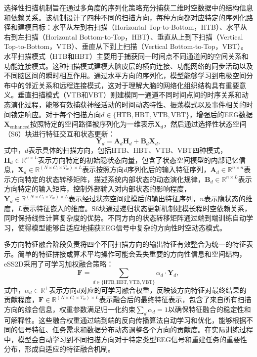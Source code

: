 选择性扫描机制旨在通过多角度的序列化策略充分捕获二维时空数据中的结构信息和依赖关系。该机制设计了四种不同的扫描方向，每种方向都对应特定的序列化路径和建模目标：水平从左到右扫描（Horizontal Top-to-Bottom，HTB）、水平从右到左扫描（Horizontal Bottom-to-Top，HBT）、垂直从上到下扫描（Vertical Top-to-Bottom，VTB）、垂直从下到上扫描（Vertical Bottom-to-Top，VBT）。
水平扫描模式（HTB和HBT）主要用于捕获同一时间点不同通道间的空间关系和功能连接模式。这种扫描模式建模大脑皮层的横向连接、功能网络的同步活动以及不同脑区间的瞬时相互作用。通过水平方向的序列化，模型能够学习到电极空间分布中的邻近关系和远程连接模式，这对于理解大脑的网络化组织结构具有重要意义。垂直扫描模式（VTB和VBT）则建模同一通道不同时间点间的时序关系和动态演化过程，能够有效捕获神经活动的时间动态特性、振荡模式以及事件相关的时间锁定响应。对于每个扫描方向$d \in \{\text{HTB}, \text{HBT}, \text{VTB}, \text{VBT}\}$，增强后的EEG数据$\mathbf{X}_{\text{enhanced}}$按照特定的空间路径被序列化为一维表示$\mathbf{X}_d$，然后通过选择性状态空间（S6）\cite{gu2021efficiently}块进行特征交互和状态更新：
\begin{equation}
\mathbf{Y}_d = \mathbf{A}_d \mathbf{H}_d + \mathbf{B}_d \mathbf{X}_d ,
\label{eq:s6_processing}
\end{equation}
式中，$d$表示具体的扫描方向，包括HTB、HBT、VTB、VBT四种模式，$\mathbf{H}_d \in \mathbb{R}^{n \times L}$表示方向特定的初始隐状态向量，包含了状态空间模型的内部记忆信息，$\mathbf{X}_d \in \mathbb{R}^{(N \times C_l \times T_w) \times L}$表示按照方向$d$序列化后的输入特征序列，$\mathbf{A}_d \in \mathbb{R}^{n \times n}$表示方向特定的状态转移矩阵，描述系统内部状态的动态演化规律，$\mathbf{B}_d \in \mathbb{R}^{n \times L}$表示方向特定的输入矩阵，控制外部输入对内部状态的影响程度，$\mathbf{Y}_d \in \mathbb{R}^{(N \times C_l \times T_w) \times L}$表示经过状态空间建模后的输出特征序列，$n$表示隐状态的维度，$L$表示特征嵌入的维度。S6块通过递归状态更新机制建模长程时空依赖关系，同时保持线性计算复杂度的优势。不同方向的状态转移矩阵通过端到端训练自动学习，使得模型能够自适应地捕获EEG信号中复杂的方向性时空动态模式。

多方向特征融合阶段负责将四个不同扫描方向的输出特征有效整合为统一的特征表示。简单的特征拼接或算术平均操作可能会丢失重要的方向性信息和空间结构，eSS2D采用了可学习加权融合策略：
\begin{equation}
\mathbf{F} = \sum_{d \in \{\text{HTB}, \text{HBT}, \text{VTB}, \text{VBT}\}} \alpha_d \cdot \mathbf{Y}_d ,
\label{eq:weighted_fusion}
\end{equation}
式中，$\alpha_d \in \mathbb{R}^+$表示方向$d$对应的可学习融合权重，反映该方向特征对最终结果的贡献程度，$\mathbf{F} \in \mathbb{R}^{(N \times C_l \times T_w) \times L}$表示融合后的最终特征表示，包含了来自所有扫描方向的综合信息，权重参数满足归一化约束$\sum_{d} \alpha_d = 1$以确保特征融合的稳定性和可解释性。这些融合权重通过端到端的反向传播算法自动学习和优化，能够根据不同的信号特征、任务需求和数据分布动态调整各个方向的贡献度。在实际训练过程中，模型会自动学习到不同扫描方向对于特定类型EEG信号和重建任务的重要性分布，形成自适应的特征融合机制。


